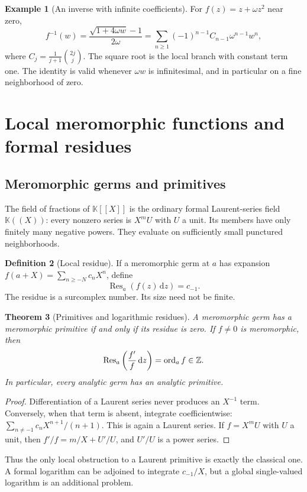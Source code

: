 \documentclass[11pt,a4paper]{article}
\newtheorem{theorem}{Theorem}[section]
\theoremstyle{definition}\newtheorem{definition}[theorem]{Definition}
\newtheorem{example}[theorem]{Example}
\theoremstyle{remark}\newtheorem{remark}[theorem]{Remark}
\newcommand{\K}{\mathbb K}
\newcommand{\Res}{\operatorname{Res}}\newcommand{\ord}{\operatorname{ord}}
\newcommand{\dd}{\,\mathrm d}
\numberwithin{equation}{section}
\begin{document}
\begin{example}[An inverse with infinite coefficients]
For $f(z)=z+\omega z^2$ near zero,
\[
 f^{-1}(w)=\frac{\sqrt{1+4\omega w}-1}{2\omega}
 =\sum_{n\geq1}(-1)^{n-1}C_{n-1}\omega^{n-1}w^n,
\]
where $C_j=\frac1{j+1}\binom{2j}{j}$. The square root is the local branch with constant term one. The identity is valid whenever $\omega w$ is infinitesimal, and in particular on a fine neighborhood of zero.
\end{example}

\section{Local meromorphic functions and formal residues}\label{sec:formalresidues}

\subsection{Meromorphic germs and primitives}
The field of fractions of $\K[[X]]$ is the ordinary formal Laurent-series field $\K((X))$: every nonzero series is $X^mU$ with $U$ a unit. Its members have only finitely many negative powers. They evaluate on sufficiently small punctured neighborhoods.

\begin{definition}[Local residue]
If a meromorphic germ at $a$ has expansion
$f(a+X)=\sum_{n\geq-N}c_nX^n$, define
\[
 \Res_a(f(z)\dd z)=c_{-1}.
\]
The residue is a surcomplex number. Its size need not be finite.
\end{definition}

\begin{theorem}[Primitives and logarithmic residues]\label{thm:formalprimitive}
A meromorphic germ has a meromorphic primitive if and only if its residue is zero. If $f\ne0$ is meromorphic, then
\[
 \Res_a\left(\frac{f'}f\dd z\right)=\ord_a f\in\Z.
\]
In particular, every analytic germ has an analytic primitive.
\end{theorem}
\begin{proof}
Differentiation of a Laurent series never produces an $X^{-1}$ term. Conversely, when that term is absent, integrate coefficientwise:
$\sum_{n\ne-1}c_nX^{n+1}/(n+1)$. This is again a Laurent series. If $f=X^mU$ with $U$ a unit, then $f'/f=m/X+U'/U$, and $U'/U$ is a power series.
\end{proof}
Thus the only local obstruction to a Laurent primitive is exactly the classical one. A formal logarithm can be adjoined to integrate $c_{-1}/X$, but a global single-valued logarithm is an additional problem.
\end{document}
